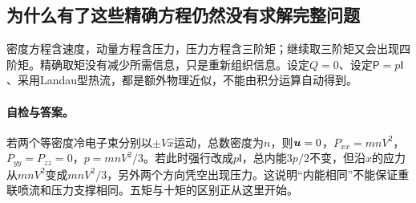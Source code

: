 \subsection{为什么有了这些精确方程仍然没有求解完整问题}
密度方程含速度，动量方程含压力，压力方程含三阶矩；继续取三阶矩又会出现四阶矩。精确取矩没有减少所需信息，只是重新组织信息。设定$Q=0$、设定$\mathsf P=p\mathsf I$、采用Landau型热流，都是额外物理近似，不能由积分运算自动得到。

\paragraph{自检与答案。}
若两个等密度冷电子束分别以$\pm V\hat x$运动，总数密度为$n$，则$\bm{u}=0$，$P_{xx}=mnV^2$，$P_{yy}=P_{zz}=0$，$p=mnV^2/3$。若此时强行改成$p\mathsf I$，总内能$3p/2$不变，但沿$x$的应力从$mnV^2$变成$mnV^2/3$，另外两个方向凭空出现压力。这说明“内能相同”不能保证重联喷流和压力支撑相同。五矩与十矩的区别正从这里开始。\citep{Wang2015,Ng2020}
